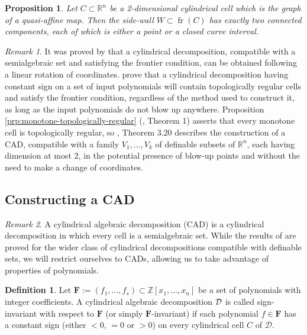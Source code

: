 \documentclass[
]{book}
\newtheorem{proposition}{Proposition}[chapter]
\theoremstyle{definition}
\newtheorem{definition}{Definition}[chapter]
\theoremstyle{definition}
\theoremstyle{definition}
\theoremstyle{definition}
\theoremstyle{remark}
\newtheorem*{remark}{Remark}
\begin{document}
\begin{proposition}
\citep[Lemma 3.4]{bgv15}
Let \(C \subset \mathbb{R}^n\) be a 2-dimensional cylindrical cell which is the graph of a quasi-affine map. Then the side-wall \(W \subset {\operatorname{fr} \left( C \right)}\) has exactly two connected components, each of which is either a point or a closed curve interval.
\end{proposition}

\begin{remark}
It was proved by \citet{pianomovers1983} that a cylindrical decomposition, compatible with a semialgebraic set and satisfying the frontier condition, can be obtained following a linear rotation of coordinates.
\citet{jhd20} prove that a cylindrical decomposition having constant sign on a set of input polynomials will contain topologically regular cells and satisfy the frontier condition, regardless of the method used to construct it, as long as the input polynomials do not blow up anywhere.
Proposition \ref{prp:monotone-topologically-regular} (\citet{bgv13}, Theorem 1) asserts that every monotone cell is topologically regular, so \citet{bgv15}, Theorem 3.20 describes the construction of a CAD, compatible with a family \(V_1,\ldots,V_k\) of definable subsets of \(\mathbb{R}^n\), each having dimension at most \(2\), in the potential presence of blow-up points and without the need to make a change of coordinates.
\end{remark}

\hypertarget{sec:cad-construction}{%
\subsection{Constructing a CAD}\label{sec:cad-construction}}

\begin{remark}
A cylindrical algebraic decomposition (CAD) is a cylindrical decomposition in which every cell is a semialgebraic set. While the results of \citet{bgv15} are proved for the wider class of cylindrical decompositions compatible with definable sets, we will restrict ourselves to CADs, allowing us to take advantage of properties of polynomials.
\end{remark}

\begin{definition}
Let \(\mathbf{F} := (f_1,\ldots,f_s) \subset \mathbb{Z}[x_1,\ldots,x_n]\) be a set of polynomials with integer coefficients. A cylindrical algebraic decomposition \(\cal D\) is called sign-invariant with respect to \(\mathbf{F}\) (or simply \(\mathbf{F}\)-invariant) if each polynomial \(f \in \mathbf{F}\) has a constant sign (either \(< 0\), \(= 0\) or \(> 0\)) on every cylindrical cell \(C\) of \(\mathcal{D}\).
\end{definition}
\end{document}
